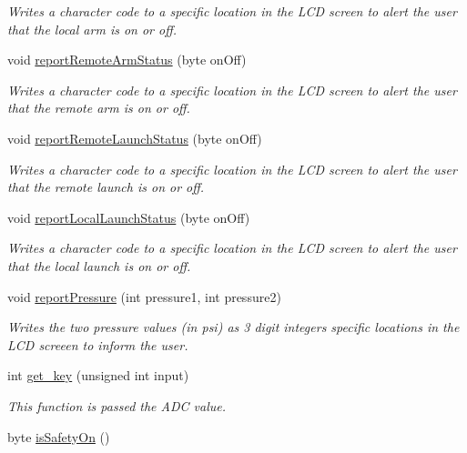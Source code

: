 \begin{DoxyCompactItemize}
\begin{DoxyCompactList}\small\item\em Writes a character code to a specific location in the L\+CD screen to alert the user that the local arm is on or off. \end{DoxyCompactList}\item 
void \hyperlink{masterPanel_8ino_a8d7691e0d4b12de3a7ad70f25f29bb0a}{report\+Remote\+Arm\+Status} (byte on\+Off)
\begin{DoxyCompactList}\small\item\em Writes a character code to a specific location in the L\+CD screen to alert the user that the remote arm is on or off. \end{DoxyCompactList}\item 
void \hyperlink{masterPanel_8ino_a274c6c0eb81e095d9f6e1a123d412fc4}{report\+Remote\+Launch\+Status} (byte on\+Off)
\begin{DoxyCompactList}\small\item\em Writes a character code to a specific location in the L\+CD screen to alert the user that the remote launch is on or off. \end{DoxyCompactList}\item 
void \hyperlink{masterPanel_8ino_a73a70351164ae78e12e03c59e2221bb5}{report\+Local\+Launch\+Status} (byte on\+Off)
\begin{DoxyCompactList}\small\item\em Writes a character code to a specific location in the L\+CD screen to alert the user that the local launch is on or off. \end{DoxyCompactList}\item 
void \hyperlink{masterPanel_8ino_ad70a4dcff0867d71a1c47b1b7d12ba86}{report\+Pressure} (int pressure1, int pressure2)
\begin{DoxyCompactList}\small\item\em Writes the two pressure values (in psi) as 3 digit integers specific locations in the L\+CD screeen to inform the user. \end{DoxyCompactList}\item 
int \hyperlink{masterPanel_8ino_ae6558c7c3eabc1f423c0198aa3034742}{get\+\_\+key} (unsigned int input)
\begin{DoxyCompactList}\small\item\em This function is passed the A\+DC value. \end{DoxyCompactList}\item 
byte \hyperlink{masterPanel_8ino_ace84c74ec48d351b8773c66146229cd3}{is\+Safety\+On} ()

\end{DoxyCompactItemize}
